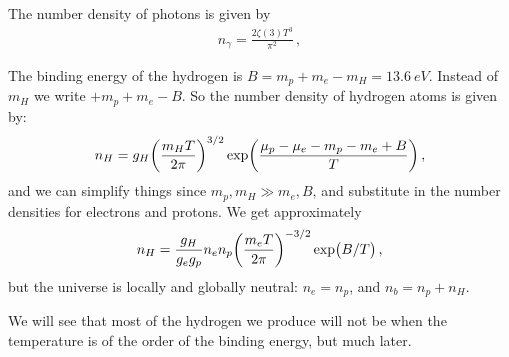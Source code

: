 \documentclass[main.tex]{subfiles}
\begin{document}
The number density of photons is given by 
%
\begin{align} \label{eq:n-gamma}
  n_{\gamma } = \frac{2 \zeta (3) T^3}{\pi^2}
\,,
\end{align}
%

The binding energy of the hydrogen is \(B=m_p+m_e-m_H=\SI{13.6}{eV}\). Instead of \(m_H\) we write \(+m_p+m_e-B\). So the number density of hydrogen atoms is given by: 
%
\begin{align}
  n_H = g_H \qty(\frac{m_H T}{2 \pi })^{3/2} \exp(\frac{\mu_p - \mu_e - m_p - m_e + B}{T})
\,,
\end{align}
%
and we can simplify things since \(m_p, m_H \gg m_e, B\), and substitute in the number densities for electrons and protons.
We get approximately
%
\begin{align}
  n_H = \frac{g_H}{g_e g_p} n_e n_p \qty(\frac{m_e T}{2 \pi })^{-3/2}\exp(B/T)
\,,
\end{align}
%
but the universe is locally and globally neutral: \(n_e = n_p\), and \(n_b = n_p + n_H\). 

We will see that most of the hydrogen we produce will not be when the temperature is of the order of the binding energy, but much later.
\end{document}
